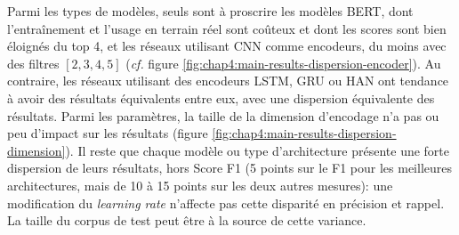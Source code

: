Parmi les types de modèles, seuls sont à proscrire les modèles BERT, dont l'entraînement et l'usage en terrain réel sont coûteux et dont les scores sont bien éloignés du top 4, et les réseaux utilisant CNN comme encodeurs, du moins avec des filtres $[2,3,4,5]$ (\textit{cf.} figure \ref{fig:chap4:main-results-dispersion-encoder}). Au contraire, les réseaux utilisant des encodeurs LSTM, GRU ou HAN ont tendance à avoir des résultats équivalents entre eux, avec une dispersion équivalente des résultats. Parmi les paramètres, la taille de la dimension d'encodage n'a pas ou peu d'impact sur les résultats (figure \ref{fig:chap4:main-results-dispersion-dimension}). Il reste que chaque modèle ou type d'architecture présente une forte dispersion de leurs résultats, hors Score F1 (5 points sur le F1 pour les meilleures architectures, mais de 10 à 15 points sur les deux autres mesures): une modification du \textit{learning rate} n'affecte pas cette disparité en précision et rappel. La taille du corpus de test peut être à la source de cette variance.


